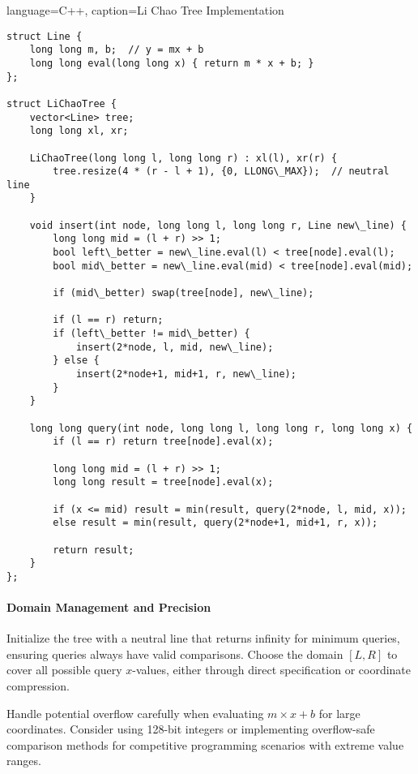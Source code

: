 \begin{marginlisting}[0pt]{language=C++, caption=Li Chao Tree Implementation}
\begin{lstlisting}
struct Line {
    long long m, b;  // y = mx + b
    long long eval(long long x) { return m * x + b; }
};

struct LiChaoTree {
    vector<Line> tree;
    long long xl, xr;
    
    LiChaoTree(long long l, long long r) : xl(l), xr(r) {
        tree.resize(4 * (r - l + 1), {0, LLONG\_MAX});  // neutral line
    }
    
    void insert(int node, long long l, long long r, Line new\_line) {
        long long mid = (l + r) >> 1;
        bool left\_better = new\_line.eval(l) < tree[node].eval(l);
        bool mid\_better = new\_line.eval(mid) < tree[node].eval(mid);
        
        if (mid\_better) swap(tree[node], new\_line);
        
        if (l == r) return;
        if (left\_better != mid\_better) {
            insert(2*node, l, mid, new\_line);
        } else {
            insert(2*node+1, mid+1, r, new\_line);
        }
    }
    
    long long query(int node, long long l, long long r, long long x) {
        if (l == r) return tree[node].eval(x);
        
        long long mid = (l + r) >> 1;
        long long result = tree[node].eval(x);
        
        if (x <= mid) result = min(result, query(2*node, l, mid, x));
        else result = min(result, query(2*node+1, mid+1, r, x));
        
        return result;
    }
};
\end{lstlisting}
\end{marginlisting}

\paragraph{Domain Management and Precision}

Initialize the tree with a neutral line that returns infinity for minimum queries, ensuring queries always have valid comparisons. Choose the domain $[L,R]$ to cover all possible query $x$-values, either through direct specification or coordinate compression.

Handle potential overflow carefully when evaluating $m \times x + b$ for large coordinates. Consider using 128-bit integers or implementing overflow-safe comparison methods for competitive programming scenarios with extreme value ranges.

